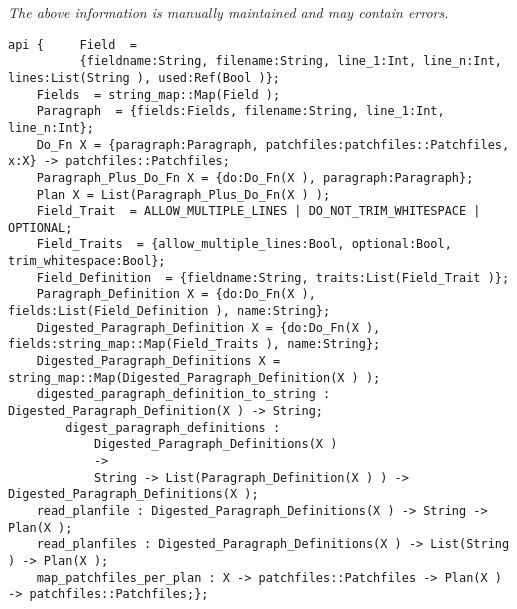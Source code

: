 \label{api:Planfile}

{\tiny \it The above information is manually maintained and may contain errors.}
\begin{verbatim}
api {     Field  =
          {fieldname:String, filename:String, line_1:Int, line_n:Int, lines:List(String ), used:Ref(Bool )};
    Fields  = string_map::Map(Field );
    Paragraph  = {fields:Fields, filename:String, line_1:Int, line_n:Int};
    Do_Fn X = {paragraph:Paragraph, patchfiles:patchfiles::Patchfiles, x:X} -> patchfiles::Patchfiles;
    Paragraph_Plus_Do_Fn X = {do:Do_Fn(X ), paragraph:Paragraph};
    Plan X = List(Paragraph_Plus_Do_Fn(X ) );
    Field_Trait  = ALLOW_MULTIPLE_LINES | DO_NOT_TRIM_WHITESPACE | OPTIONAL;
    Field_Traits  = {allow_multiple_lines:Bool, optional:Bool, trim_whitespace:Bool};
    Field_Definition  = {fieldname:String, traits:List(Field_Trait )};
    Paragraph_Definition X = {do:Do_Fn(X ), fields:List(Field_Definition ), name:String};
    Digested_Paragraph_Definition X = {do:Do_Fn(X ), fields:string_map::Map(Field_Traits ), name:String};
    Digested_Paragraph_Definitions X = string_map::Map(Digested_Paragraph_Definition(X ) );
    digested_paragraph_definition_to_string : Digested_Paragraph_Definition(X ) -> String;
        digest_paragraph_definitions :
            Digested_Paragraph_Definitions(X )
            ->
            String -> List(Paragraph_Definition(X ) ) -> Digested_Paragraph_Definitions(X );
    read_planfile : Digested_Paragraph_Definitions(X ) -> String -> Plan(X );
    read_planfiles : Digested_Paragraph_Definitions(X ) -> List(String ) -> Plan(X );
    map_patchfiles_per_plan : X -> patchfiles::Patchfiles -> Plan(X ) -> patchfiles::Patchfiles;};
\end{verbatim}
